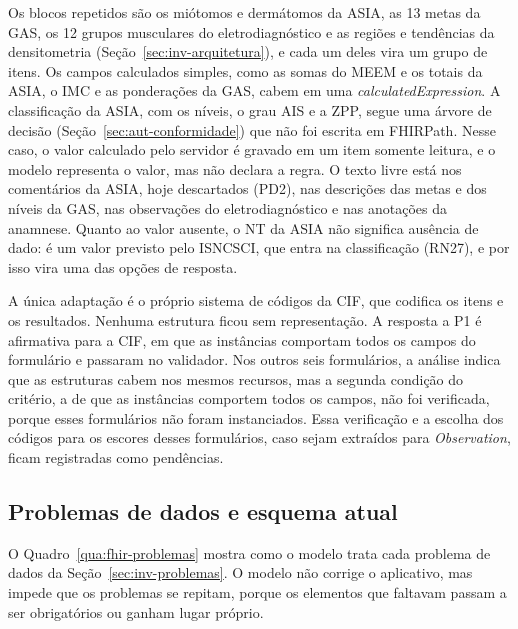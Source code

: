 Os blocos repetidos são os miótomos e dermátomos da ASIA, as 13 metas da GAS, os 12 grupos musculares do
eletrodiagnóstico e as regiões e tendências da densitometria (Seção~\ref{sec:inv-arquitetura}), e cada um deles vira
um grupo de itens. Os campos calculados simples, como as somas do MEEM e os totais da ASIA, o IMC e as ponderações da
GAS, cabem em uma \textit{calculatedExpression}. A classificação da ASIA, com os níveis, o grau AIS e a ZPP, segue
uma árvore de decisão (Seção~\ref{sec:aut-conformidade}) que não foi escrita em FHIRPath. Nesse caso, o valor
calculado pelo servidor é gravado em um item somente leitura, e o modelo representa o valor, mas não declara a regra.
O texto livre está nos comentários da ASIA, hoje descartados (PD2), nas descrições das metas e dos níveis da GAS, nas
observações do eletrodiagnóstico e nas anotações da anamnese. Quanto ao valor ausente, o NT da ASIA não significa
ausência de dado: é um valor previsto pelo ISNCSCI, que entra na classificação (RN27), e por isso vira uma das opções
de resposta.

A única adaptação é o próprio sistema de códigos da CIF, que codifica os itens e os resultados. Nenhuma estrutura
ficou sem representação. A resposta a P1 é afirmativa para a CIF, em que as instâncias comportam todos os campos do
formulário e passaram no validador. Nos outros seis formulários, a análise indica que as estruturas cabem nos mesmos
recursos, mas a segunda condição do critério, a de que as instâncias comportem todos os campos, não foi verificada,
porque esses formulários não foram instanciados. Essa verificação e a escolha dos códigos para os escores desses
formulários, caso sejam extraídos para \textit{Observation}, ficam registradas como pendências.

\subsection{Problemas de dados e esquema atual}
\label{sec:fhir-problemas}

O Quadro~\ref{qua:fhir-problemas} mostra como o modelo trata cada problema de dados da
Seção~\ref{sec:inv-problemas}. O modelo não corrige o aplicativo, mas impede que os problemas se repitam, porque os
elementos que faltavam passam a ser obrigatórios ou ganham lugar próprio.

